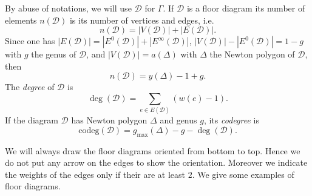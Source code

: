\documentclass[11pt]{article}
\theoremstyle{definition}
\numberwithin{equation}{section}
\newcommand{\D}{\mathcal{D}}
\newcommand{\codeg}{\mathrm{codeg}}
\newcommand{\dsum}{\displaystyle\sum}
\newcommand{\gmax}{g_{\max}}
\theoremstyle{plain}
\begin{document}
By abuse of notations, we will use $\D$ for $\Gamma$. If $\D$ is a floor diagram its number of elements $n(\D)$ is its number of vertices and edges, i.e.  
\[ n(\D) = |V(\D)| + |E(\D) |. \]
Since one has $|E(\D)| = |E^0(\D)| + |E^\infty(\D)|$, $|V(\D)| - |E^0(\D)| = 1-g$ with $g$ the genus of $\D$, and $|V(\D)| = a(\Delta)$ with $\Delta$ the Newton polygon of $\D$, then 
\[ n(\D) = y(\Delta)-1+g . \]
The \emph{degree} of $\D$ is 
    \[ \deg(\D) = \dsum_{e\in E(\D)} (w(e)-1) . \]
If the diagram $\D$ has Newton polygon $\Delta$ and genus $g$, its \emph{codegree} is
    \[ \codeg(\D) = \gmax(\Delta) -g-\deg(\D) . \]

We will always draw the floor diagrams oriented from bottom to top. Hence we do not put any arrow on the edges to show the orientation. Moreover we indicate the weights of the edges only if their are at least $2$. We give some examples of floor diagrams.
\end{document}
